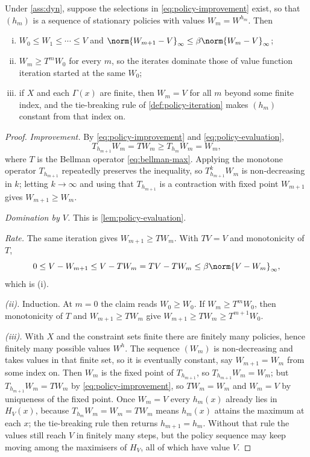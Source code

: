 \begin{theorem}\label{thm:policy-iteration}
	Under \autoref{ass:dyn}, suppose the selections in
	\eqref{eq:policy-improvement} exist, so that $(h_m)$ is a sequence of
	stationary policies with values $W_m=W^{h_m}$. Then
	\begin{enumerate}[(i)]
		\item $W_0\leq W_1\leq\cdots\leq V$ and
		      $\norm{W_{m+1}-V}_\infty\leq\beta\norm{W_m-V}_\infty$;
		\item $W_m\geq T^{m}W_0$ for every $m$, so the iterates dominate those of
		      value function iteration started at the same $W_0$;
		\item if $X$ and each $\Gamma(x)$ are finite, then $W_m=V$ for all $m$
		      beyond some finite index, and the tie-breaking rule of
		      \autoref{def:policy-iteration} makes $(h_m)$ constant from that index
		      on.
	\end{enumerate}
\end{theorem}

\begin{proof}
	\emph{Improvement.} By \eqref{eq:policy-improvement} and
	\eqref{eq:policy-evaluation},
	\[
		T_{h_{m+1}}W_m=TW_m\geq T_{h_m}W_m=W_m ,
	\]
	where $T$ is the Bellman operator \eqref{eq:bellman-max}. Applying the
	monotone operator $T_{h_{m+1}}$ repeatedly preserves the inequality, so
	$T_{h_{m+1}}^{k}W_m$ is non-decreasing in $k$; letting $k\to\infty$ and using
	that $T_{h_{m+1}}$ is a contraction with fixed point $W_{m+1}$ gives
	$W_{m+1}\geq W_m$.

	\emph{Domination by $V$.} This is \autoref{lem:policy-evaluation}.

	\emph{Rate.} The same iteration gives $W_{m+1}\geq TW_m$. With $TV=V$ and
	monotonicity of $T$,
	\[
		0\leq V-W_{m+1}\leq V-TW_m=TV-TW_m\leq\beta\norm{V-W_m}_\infty ,
	\]
	which is (i).

	\emph{(ii).} Induction. At $m=0$ the claim reads $W_0\geq W_0$. If
	$W_m\geq T^{m}W_0$, then monotonicity of $T$ and $W_{m+1}\geq TW_m$ give
	$W_{m+1}\geq TW_m\geq T^{m+1}W_0$.

	\emph{(iii).} With $X$ and the constraint sets finite there are finitely many
	policies, hence finitely many possible values $W^{h}$. The sequence $(W_m)$
	is non-decreasing and takes values in that finite set, so it is eventually
	constant, say $W_{m+1}=W_m$ from some index on. Then $W_m$ is the fixed point
	of $T_{h_{m+1}}$, so $T_{h_{m+1}}W_m=W_m$; but $T_{h_{m+1}}W_m=TW_m$ by
	\eqref{eq:policy-improvement}, so $TW_m=W_m$ and $W_m=V$ by uniqueness of the
	fixed point. Once $W_m=V$ every $h_m(x)$ already lies in $H_{V}(x)$, because
	$T_{h_m}W_m=W_m=TW_m$ means $h_m(x)$ attains the maximum at each $x$; the
	tie-breaking rule then returns $h_{m+1}=h_m$. Without that rule the values
	still reach $V$ in finitely many steps, but the policy sequence may keep
	moving among the maximisers of $H_V$, all of which have value $V$.
\end{proof}

